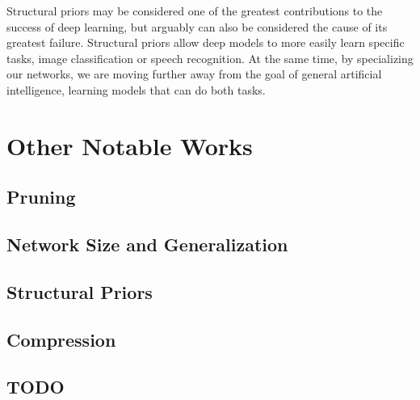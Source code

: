 \documentclass[thesis]{subfiles}
\begin{document}
    Structural priors may be considered one of the greatest contributions to the success of deep learning, but arguably can also be considered the cause of its greatest failure. Structural priors allow deep models to more easily learn specific tasks, \ie image classification or speech recognition. At the same time, by specializing our networks, we are moving further away from the goal of general artificial intelligence, \ie learning models that can do both tasks.
    
\section{Other Notable Works}
\subsection{Pruning}
\citep{mozer1989using, mozer1989skeletonization, castellano1997iterative,gorodkin1993quantitative,han2016dsd,han2015learning,setiono1997penalty,}

\subsection{Network Size and Generalization}
\citep{denker1987large, giles1987learning, hinton1987learning, lecun1989generalization, ahmad1989scaling,hanson1989comparing,}

\subsection{Structural Priors}
\citep{Fuk80,lecun1989backpropagation,}

\subsection{Compression}
\citep{han2015deep,Kim2016,ullrich2017soft,}

\subsection{TODO}
\citep{mackay1992practical,schwartz1990exhaustive,}

    
	
\end{document}

